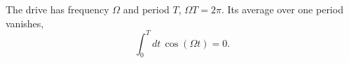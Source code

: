 \documentclass{article}
\begin{document}
The drive has frequency $\Omega$ and period $T$, $\Omega T = 2\pi$. Its average over one period vanishes,
\begin{equation}
\int_0^{T} dt\, \cos(\Omega t) = 0 .
\label{eq:avg}
\end{equation}
\end{document}
